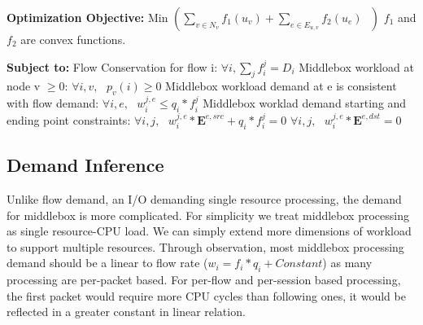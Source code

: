 \documentclass{sig-alternate}
\begin{document}
\textbf{Optimization Objective:}
\newline
\newline
Min $ ( \sum\limits_{v \in N_v}f_1(u_v) +\sum\limits_{e \in E_{u,v}}f_2(u_e) \text{  } )$
\newline
\newline
$f_1 $ and $f_2$ are convex functions. 
\newline
\newline

\textbf{Subject to:}
\newline
Flow Conservation for flow i:  
\newline
\newline
$ \forall i, \sum\limits_j f_i^j = D_i $
\newline
\newline
Middlebox workload at node v $\geq$0:
\newline
\newline
$\forall i,v, \text{  }p_v(i)\geq 0 $
\newline
\newline
Middlebox workload demand at e is consistent with flow demand:
\newline
\newline
$\forall i, e, \text{  } w_i^{j,e} \leq q_i * f_i^j$
\newline
\newline
Middlebox worklad demand starting and ending point constraints:
\newline
$ \forall i,j, \text{ } w_i^{j,e}*\boldsymbol{E}^{e,src}  + q_i * f_i^j =0 $
\newline
\newline
$ \forall i,j, \text{ } w_i^{j,e}*\boldsymbol{E}^{e,dst} = 0 $
\newline

\subsection{Demand Inference}
Unlike flow demand, an I/O demanding single resource processing, the demand for middlebox is more complicated. For simplicity we treat middlebox processing as single resource-CPU load. We can simply extend more dimensions of workload to support multiple resources. Through observation, most middlebox processing demand should be a linear to flow rate ($w_i = f_i*q_i+ Constant$) as many processing are per-packet based. For per-flow and per-session based processing, the first packet would require more CPU cycles than following ones, it would be reflected in a greater constant in linear relation. 
\end{document}
